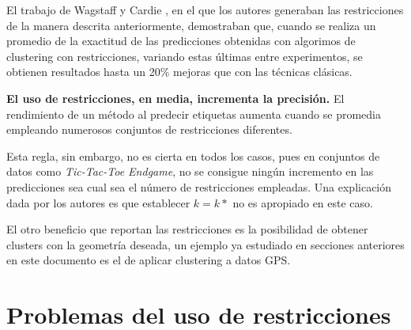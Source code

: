 El trabajo de Wagstaff y Cardie \cite{WagstaffCardie:2000}, en el que los autores generaban las restricciones de la manera descrita anteriormente, demostraban que, cuando se realiza un promedio de la exactitud de las predicciones obtenidas con algorimos de clustering con restricciones, variando estas últimas entre experimentos, se obtienen resultados hasta un 20\% mejoras que con las técnicas clásicas.

\begin{observacion}
	
	\textbf{El uso de restricciones, en media, incrementa la precisión.}
	El rendimiento de un método al predecir etiquetas aumenta cuando se promedia empleando numerosos conjuntos de restricciones diferentes.\cite{Survey:2007}
	
\end{observacion}

Esta regla, sin embargo, no es cierta en todos los casos, pues en conjuntos de datos como \textit{Tic-Tac-Toe Endgame}, no se consigue ningún incremento en las predicciones sea cual sea el número de restricciones empleadas. Una explicación dada por los autores es que establecer $k = k*$ no es apropiado en este caso.

El otro beneficio que reportan las restricciones es la posibilidad de obtener clusters con la geometría deseada, un ejemplo ya estudiado en secciones anteriores en este documento es el de aplicar clustering a datos \acs{GPS}.

\section{Problemas del uso de restricciones}




























